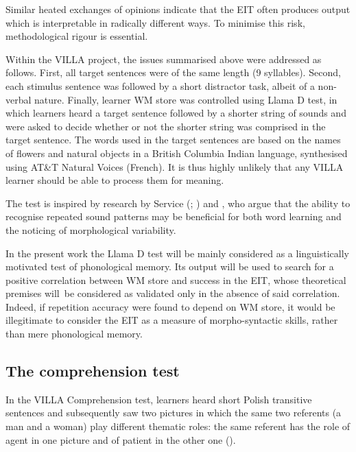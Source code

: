 Similar heated exchanges of opinions indicate that the EIT often produces output which is interpretable in radically different ways. To minimise this risk, methodological rigour is essential.

Within the VILLA project, the issues summarised above were addressed as follows. First, all target sentences were of the same length (9 syllables). Second, each stimulus sentence was followed by a short distractor task, albeit of a non-verbal nature. Finally, learner WM store was controlled using  Llama D test, in which learners heard a target sentence followed by a shorter string of sounds and were asked to decide whether or not the shorter string was comprised in the target sentence. The words used in the target sentences are based on the names of flowers and natural objects in a British Columbia Indian language, synthesised using AT\&T Natural Voices (French). It is thus highly unlikely that any VILLA learner should be able to process them for meaning.

The test is inspired by research by Service (\citeyear{Service1992}; \citealt{ServiceKohonen1995}) and \citealt{SpecialeEtAl2004}, who argue that the ability to recognise repeated sound patterns may be beneficial for both word learning and the noticing of morphological variability. 

In the present work the Llama D test will be mainly considered as a linguistically motivated test of phonological memory. Its output will be used to search for a positive correlation between WM store and success in the EIT, whose theoretical premises will~be considered as validated only in the absence of said correlation. Indeed, if repetition accuracy were found to depend on WM store, it would be illegitimate to consider the EIT as a measure of morpho-syntactic skills, rather than mere phonological memory.

\subsection{The comprehension test}\label{sec:02:4.4}

In the VILLA Comprehension test, learners heard short Polish transitive sentences and subsequently saw two pictures in which the same two referents (a man and a woman) play different thematic roles: the same referent has the role of agent in one picture and of patient in the other one ().


